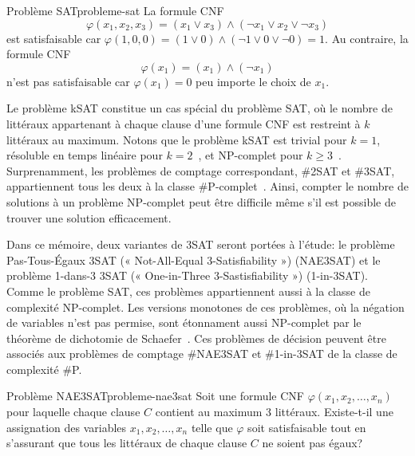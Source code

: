 \begin{example}{Problème SAT}{probleme-sat}
    La formule CNF
    \begin{equation*}
        \varphi(x_{1}, x_{2}, x_{3}) = (x_{1} \lor x_{3}) \land (\neg x_{1} \lor x_{2} \lor \neg x_{3}) 
    \end{equation*}
    est satisfaisable car $\varphi(1,0,0) = (1 \lor 0) \land (\neg 1 \lor 0 \lor \neg 0) = 1$. Au contraire, la formule CNF
    \begin{equation*}
        \varphi(x_{1})= (x_{1}) \land (\neg x_{1})
    \end{equation*}
    n'est pas satisfaisable car $\varphi (x_{1}) = 0$ peu importe le choix de $x_{1}$.
\end{example}


Le problème kSAT constitue un cas spécial du problème SAT, où le nombre de littéraux appartenant à chaque clause d'une formule CNF est restreint à $k$ littéraux au maximum. Notons que le problème kSAT est trivial pour $k=1$, résoluble en temps linéaire pour $k=2$~\cite{kromDecisionProblemClass1967}, et \textsf{NP}-complet pour $k \geq 3$~\cite{karpReducibilityCombinatorialProblems1972}. Surprenamment, les problèmes de comptage correspondant, \#2SAT et \#3SAT, appartiennent tous les deux à la classe \textsf{\#P}-complet~\cite{valiantComplexityEnumerationReliability1979}. Ainsi, compter le nombre de solutions à un problème \textsf{NP}-complet peut être difficile même s'il est possible de trouver une solution efficacement.

Dans ce mémoire, deux variantes de 3SAT seront portées à l'étude: le problème Pas-Tous-Égaux 3SAT (« Not-All-Equal 3-Satisfiability ») (NAE3SAT) et le problème 1-dans-3 3SAT (« One-in-Three 3-Sastisfiability ») (1-in-3SAT). 
Comme le problème SAT, ces problèmes appartiennent aussi à la classe de complexité \textsf{NP}-complet. Les versions monotones de ces problèmes, où la négation de variables n'est pas permise, sont étonnament aussi \textsf{NP}-complet par le théorème de dichotomie de Schaefer~\cite{schaeferComplexitySatisfiabilityProblems1978}. Ces problèmes de décision peuvent être associés aux problèmes de comptage \#NAE3SAT et \#1-in-3SAT de la classe de complexité \textsf{\#P}.

\begin{maindefinition}{Problème NAE3SAT}{probleme-nae3sat}
    Soit une formule CNF $\varphi(x_{1}, x_{2}, \dots, x_{n})$ pour laquelle chaque clause $C$ contient au maximum 3 littéraux. Existe-t-il une assignation des variables $x_{1}, x_{2}, \dots, x_{n}$ telle que $\varphi$ soit satisfaisable tout en s'assurant que tous les littéraux de chaque clause $C$ ne soient pas égaux?
\end{maindefinition}

